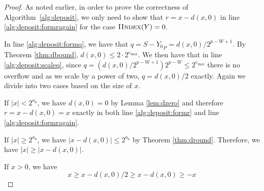 \begin{proof}
\begin{comment}
        Next, we show that $S - {Y_0}_P = d(x, 0)/2^{p - W + 1}$.

        We divide into two cases based on the size of $x$.

        If $|x| < 2^{a_0} = 2^{e_{\max} + 1 - W}$, then we have $|r| < 2^{a_0 - p + W - 1}$ in line \ref{alg:deposit:scaler} regardless of whether or not there is underflow in the division as we scale by a power of two.
         Therefore, since $|r| < 2^{a_0 - p + W - 1}$, $S - {Y_0}_P = \roundtonearestinfty(r, a_0 - p + W) = 0 = d(x, 0)/2^{p - W - 1}$ by Lemma \ref{lem:dzero}.

        If $|x| \geq 2^{a_0}= 2^{e_{\max} + 1 - W}$, then there is no underflow in line \ref{alg:deposit:scaler} and $r = x / 2^{p - W + 1}$ exactly as we scale by a power of two. Therefore, $S - {Y_0}_P = \roundtonearestinfty(x/2^{p - W + 1}, a_0 - p + W) = d(x, 0)/2^{p - W + 1}$

        At this point, all that remains to be shown is that $r = x - d(x, 0)$ in line \ref{alg:deposit:formragain}. 
        \end{comment}

        As noted earlier, in order to prove the correctness of Algorithm~\ref{alg:deposit},
        we only need to show that $r = x - d(x, 0)$ in line \ref{alg:deposit:formragain} 
        for the case $\textproc{IIndex}(Y) = 0$.

        In line \ref{alg:deposit:formq}, we have that
        \(
            q = S - {Y_0}_P = d(x,0)/2^{p - W + 1}.
        \)
        By Theorem \ref{thm:dbound}, $d(x, 0) \leq 2 \cdot
        2^{e_{\max}}$. We then have that in line \ref{alg:deposit:scaleq},
        since $q = (d(x, 0)/2^{p - W + 1})2^{p - W} \leq 2^{e_{\max}}$ there is
        no overflow and as we scale by a power of two, $q = d(x, 0)/2$ exactly.
        Again we divide into two cases based on the size of $x$.

        If $|x| < 2^{a_0}$, we have $d(x, 0) = 0$ by Lemma \ref{lem:dzero} and therefore
        $r = x - d(x, 0) = x$ exactly in both line \ref{alg:deposit:formr}
        and line \ref{alg:deposit:formragain}.

        If $|x| \geq 2^{a_0}$, we have $|x - d(x, 0)| \leq 2^{a_0}$ by Theorem \ref{thm:dround}.
        Therefore, we have $|x| \geq |x - d(x, 0)|$. 

        If $x > 0$, we have
        \begin{equation*}
          x \geq x - d(x, 0)/2 \geq x - d(x, 0) \geq -x
        \end{equation*}


\end{proof}
